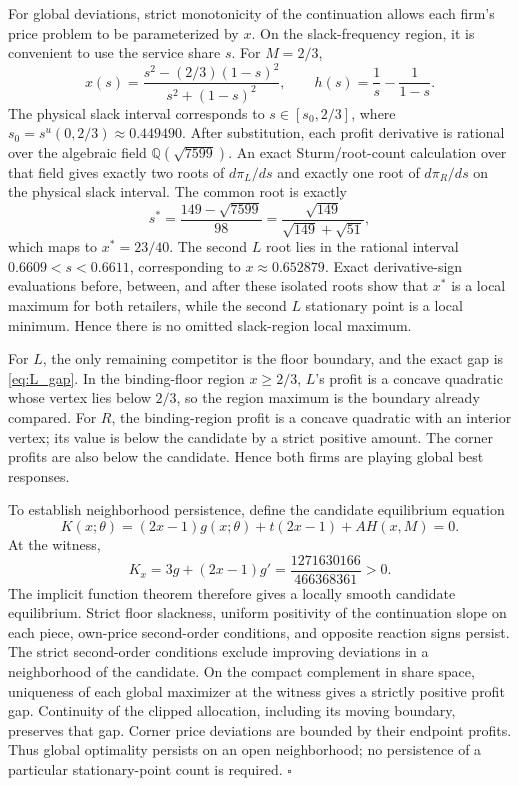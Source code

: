 For global deviations, strict monotonicity of the continuation allows each firm's price problem to be parameterized by $x$. On the slack-frequency region, it is convenient to use the service share $s$. For $M=2/3$,
\begin{equation}
x(s)=\frac{s^2-(2/3)(1-s)^2}{s^2+(1-s)^2},
\qquad
h(s)=\frac1s-\frac1{1-s}.
\end{equation}
The physical slack interval corresponds to $s\in[s_0,2/3]$, where $s_0=s^u(0,2/3)\approx0.449490$. After substitution, each profit derivative is rational over the algebraic field $\mathbb{Q}(\sqrt{7599})$. An exact Sturm/root-count calculation over that field gives exactly two roots of $d\pi_L/ds$ and exactly one root of $d\pi_R/ds$ on the physical slack interval. The common root is exactly
\begin{equation}
s^*=\frac{149-\sqrt{7599}}{98}
=\frac{\sqrt{149}}{\sqrt{149}+\sqrt{51}},
\end{equation}
which maps to $x^*=23/40$. The second $L$ root lies in the rational interval $0.6609<s<0.6611$, corresponding to $x\approx0.652879$. Exact derivative-sign evaluations before, between, and after these isolated roots show that $x^*$ is a local maximum for both retailers, while the second $L$ stationary point is a local minimum. Hence there is no omitted slack-region local maximum.

For $L$, the only remaining competitor is the floor boundary, and the exact gap is \eqref{eq:L_gap}. In the binding-floor region $x\geq2/3$, $L$'s profit is a concave quadratic whose vertex lies below $2/3$, so the region maximum is the boundary already compared. For $R$, the binding-region profit is a concave quadratic with an interior vertex; its value is below the candidate by a strict positive amount. The corner profits are also below the candidate. Hence both firms are playing global best responses.

To establish neighborhood persistence, define the candidate equilibrium equation
\[
K(x;\theta)=(2x-1)g(x;\theta)+t(2x-1)+AH(x,M)=0.
\]
At the witness,
\[
K_x=3g+(2x-1)g'=\frac{1271630166}{466368361}>0.
\]
The implicit function theorem therefore gives a locally smooth candidate equilibrium. Strict floor slackness, uniform positivity of the continuation slope on each piece, own-price second-order conditions, and opposite reaction signs persist. The strict second-order conditions exclude improving deviations in a neighborhood of the candidate. On the compact complement in share space, uniqueness of each global maximizer at the witness gives a strictly positive profit gap. Continuity of the clipped allocation, including its moving boundary, preserves that gap. Corner price deviations are bounded by their endpoint profits. Thus global optimality persists on an open neighborhood; no persistence of a particular stationary-point count is required. \hfill$\square$

